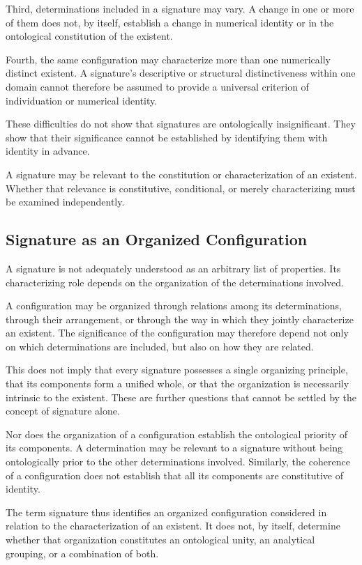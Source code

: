 Third, determinations included in a signature may vary.
A change in one or more of them does not, by itself,
establish a change in numerical identity or in the
ontological constitution of the existent.

Fourth, the same configuration may characterize more
than one numerically distinct existent. A signature's
descriptive or structural distinctiveness within one
domain cannot therefore be assumed to provide a
universal criterion of individuation or numerical identity.

These difficulties do not show that signatures are
ontologically insignificant. They show that their
significance cannot be established by identifying them
with identity in advance.

A signature may be relevant to the constitution or
characterization of an existent. Whether that relevance
is constitutive, conditional, or merely characterizing
must be examined independently.

\subsection{Signature as an Organized Configuration}

A signature is not adequately understood as an arbitrary
list of properties. Its characterizing role depends on
the organization of the determinations involved.

A configuration may be organized through relations among
its determinations, through their arrangement, or through
the way in which they jointly characterize an existent.
The significance of the configuration may therefore
depend not only on which determinations are included,
but also on how they are related.

This does not imply that every signature possesses a
single organizing principle, that its components form
a unified whole, or that the organization is necessarily
intrinsic to the existent. These are further questions
that cannot be settled by the concept of signature alone.

Nor does the organization of a configuration establish
the ontological priority of its components. A determination
may be relevant to a signature without being ontologically
prior to the other determinations involved. Similarly,
the coherence of a configuration does not establish that
all its components are constitutive of identity.

The term signature thus identifies an organized
configuration considered in relation to the
characterization of an existent. It does not, by itself,
determine whether that organization constitutes an
ontological unity, an analytical grouping, or a
combination of both.

